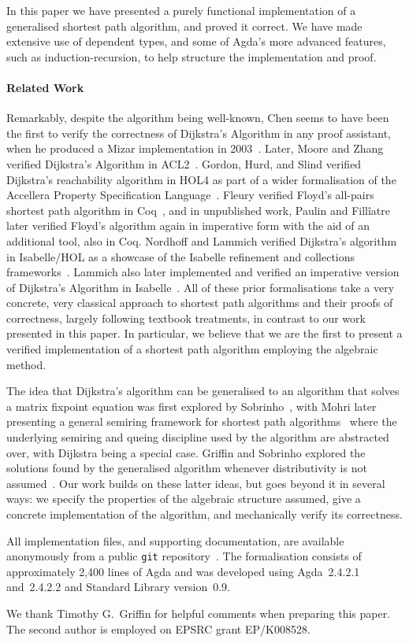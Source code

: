 In this paper we have presented a purely functional implementation of a generalised shortest path algorithm, and proved it correct.
We have made extensive use of dependent types, and some of Agda's more advanced features, such as induction-recursion, to help structure the implementation and proof.

\paragraph{Related Work}
Remarkably, despite the algorithm being well-known, Chen seems to have been the first to verify the correctness of Dijkstra's Algorithm in any proof assistant, when he produced a Mizar implementation in 2003~\cite{chen:dijkstra:2003}.
Later, Moore and Zhang verified Dijkstra's Algorithm in ACL2~\cite{moore:proof-pearl:2005}.
Gordon, Hurd, and Slind verified Dijkstra's reachability algorithm in HOL4 as part of a wider formalisation of the Accellera Property Specification Language~\cite{gordon:executing:2003}.
Fleury verified Floyd's all-pairs shortest path algorithm in Coq~\cite{fleury:implantation:1990}, and in unpublished work, Paulin and Fill\^iatre later verified Floyd's algorithm again in imperative form with the aid of an additional tool, also in Coq.
Nordhoff and Lammich verified Dijkstra's algorithm in Isabelle/HOL as a showcase of the Isabelle refinement and collections frameworks~\cite{nordhoff-dijkstra-2012}.
Lammich also later implemented and verified an imperative version of Dijkstra's Algorithm in Isabelle~\cite{lammich:refinement:2015}.
All of these prior formalisations take a very concrete, very classical approach to shortest path algorithms and their proofs of correctness, largely following textbook treatments, in contrast to our work presented in this paper.
In particular, we believe that we are the first to present a verified implementation of a shortest path algorithm employing the algebraic method.

The idea that Dijkstra's algorithm can be generalised to an algorithm that solves a matrix fixpoint equation was first explored by Sobrinho~\cite{sobrinho_algebra_2001}, with Mohri later presenting a general semiring framework for shortest path algorithms~\cite{mohri:semiring:2002} where the underlying semiring and queing discipline used by the algorithm are abstracted over, with Dijkstra being a special case.
Griffin and Sobrinho explored the solutions found by the generalised algorithm whenever distributivity is not assumed~\cite{sobrinho_routing_2010}.
Our work builds on these latter ideas, but goes beyond it in several ways: we specify the properties of the algebraic structure assumed, give a concrete implementation of the algorithm, and mechanically verify its correctness.

All implementation files, and supporting documentation, are available anonymously from a public \texttt{git} repository~\cite{markert_formalised_2015}.
The formalisation consists of approximately 2,400 lines of Agda and was developed using Agda~2.4.2.1 and~2.4.2.2 and Standard Library version~0.9.

We thank Timothy G.~Griffin for helpful comments when preparing this paper.
The second author is employed on EPSRC grant EP/K008528.
